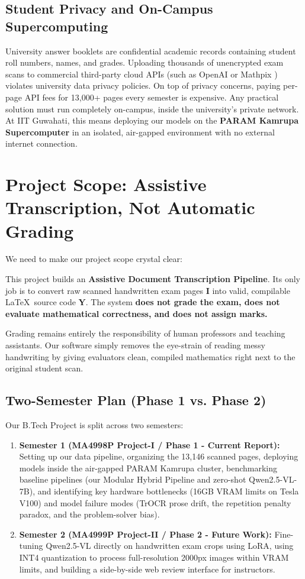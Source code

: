 \subsection{Student Privacy and On-Campus Supercomputing}
University answer booklets are confidential academic records containing student roll numbers, names, and grades. Uploading thousands of unencrypted exam scans to commercial third-party cloud APIs (such as OpenAI or Mathpix \cite{mathpix2020technology}) violates university data privacy policies. On top of privacy concerns, paying per-page API fees for 13,000+ pages every semester is expensive. Any practical solution must run completely on-campus, inside the university's private network. At IIT Guwahati, this means deploying our models on the \textbf{PARAM Kamrupa Supercomputer} in an isolated, air-gapped environment with no external internet connection.

\section{Project Scope: Assistive Transcription, Not Automatic Grading}
\label{sec:scope_boundaries}

We need to make our project scope crystal clear:
\begin{definition}
This project builds an \textbf{Assistive Document Transcription Pipeline}. Its only job is to convert raw scanned handwritten exam pages $\mathbf{I}$ into valid, compilable \LaTeX\ source code $\mathbf{Y}$. The system \textbf{does not grade the exam, does not evaluate mathematical correctness, and does not assign marks.}
\end{definition}

Grading remains entirely the responsibility of human professors and teaching assistants. Our software simply removes the eye-strain of reading messy handwriting by giving evaluators clean, compiled mathematics right next to the original student scan.

\subsection{Two-Semester Plan (Phase 1 vs. Phase 2)}
Our B.Tech Project is split across two semesters:
\begin{enumerate}
    \item \textbf{Semester 1 (MA4998P Project-I / Phase 1 - Current Report):} Setting up our data pipeline, organizing the 13,146 scanned pages, deploying models inside the air-gapped PARAM Kamrupa cluster, benchmarking baseline pipelines (our Modular Hybrid Pipeline and zero-shot Qwen2.5-VL-7B), and identifying key hardware bottlenecks (16GB VRAM limits on Tesla V100) and model failure modes (TrOCR prose drift, the repetition penalty paradox, and the problem-solver bias).
    \item \textbf{Semester 2 (MA4999P Project-II / Phase 2 - Future Work):} Fine-tuning Qwen2.5-VL directly on handwritten exam crops using LoRA, using INT4 quantization to process full-resolution 2000px images within VRAM limits, and building a side-by-side web review interface for instructors.
\end{enumerate}

